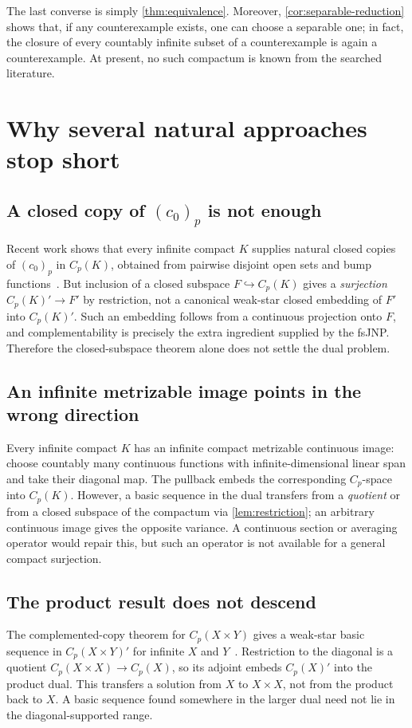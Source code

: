 \documentclass[11pt]{article}
\newcommand{\Cp}{C_p}
\newcommand{\czerop}{(c_0)_p}
\begin{document}
The last converse is simply \cref{thm:equivalence}.  Moreover,
\cref{cor:separable-reduction} shows that, if any counterexample exists, one
can choose a separable one; in fact, the closure of every countably infinite
subset of a counterexample is again a counterexample.  At present, no such
compactum is known from the searched literature.

\section{Why several natural approaches stop short}

\subsection*{A closed copy of $\czerop$ is not enough}
Recent work shows that every infinite compact $K$ supplies natural closed
copies of $\czerop$ in $\Cp(K)$, obtained from pairwise disjoint open sets and
bump functions~\cite{KMS2023}.  But inclusion of a closed subspace
$F\hookrightarrow\Cp(K)$ gives a \emph{surjection}
$\Cp(K)'\to F'$ by restriction, not a canonical weak-star closed embedding of
$F'$ into $\Cp(K)'$.  Such an embedding follows from a continuous projection
onto $F$, and complementability is precisely the extra ingredient supplied by
the fsJNP.  Therefore the closed-subspace theorem alone does not settle the
dual problem.

\subsection*{An infinite metrizable image points in the wrong direction}
Every infinite compact $K$ has an infinite compact metrizable continuous image:
choose countably many continuous functions with infinite-dimensional linear
span and take their diagonal map.  The pullback embeds the corresponding
$\Cp$-space into $\Cp(K)$.  However, a basic sequence in the dual transfers
from a \emph{quotient} or from a closed subspace of the compactum via
\cref{lem:restriction}; an arbitrary continuous image gives the opposite
variance.  A continuous section or averaging operator would repair this, but
such an operator is not available for a general compact surjection.

\subsection*{The product result does not descend}
The complemented-copy theorem for $\Cp(X\times Y)$ gives a weak-star basic
sequence in $\Cp(X\times Y)'$ for infinite $X$ and $Y$~\cite{KMSZ2022}.
Restriction to the diagonal is a quotient
$\Cp(X\times X)\to\Cp(X)$, so its adjoint embeds $\Cp(X)'$ into the product
dual.  This transfers a solution from $X$ to $X\times X$, not from the product
back to $X$.  A basic sequence found somewhere in the larger dual need not lie
in the diagonal-supported range.
\end{document}
